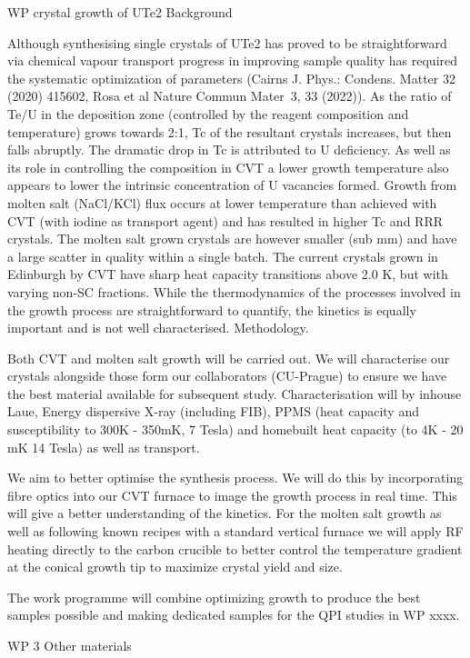 WP crystal growth of UTe2
Background

Although synthesising single crystals of UTe2 has proved to be straightforward via chemical vapour transport progress in improving sample quality has required the systematic optimization of parameters (Cairns J. Phys.: Condens. Matter 32 (2020) 415602, Rosa et al Nature Commun Mater 3, 33 (2022)). As the ratio of Te/U in the deposition zone (controlled by the reagent composition and temperature) grows towards 2:1, Tc of the resultant crystals increases, but then falls abruptly. The dramatic drop in Tc is attributed to U deficiency. As well as its role in controlling the composition in CVT a lower growth temperature also appears to lower the intrinsic concentration of U vacancies formed. Growth from molten salt (NaCl/KCl) flux occurs at lower temperature than achieved with CVT (with iodine as transport agent) and has resulted in higher Tc and RRR crystals. The molten salt grown crystals are however smaller (sub mm) and have a large scatter in quality within a single batch. The current crystals grown in Edinburgh by CVT have sharp heat capacity transitions above 2.0 K, but with varying non-SC fractions. While the thermodynamics of the processes involved in the growth process are straightforward to quantify, the kinetics is equally important and is not well characterised.
Methodology.

Both CVT and molten salt growth will be carried out. We will characterise our crystals alongside those form our collaborators (CU-Prague) to ensure we have the best material available for subsequent study. Characterisation will  by inhouse Laue, Energy dispersive X-ray (including FIB), PPMS (heat capacity and susceptibility to 300K - 350mK, 7 Tesla) and homebuilt heat capacity (to 4K - 20 mK 14 Tesla) as well as transport.

We aim to better optimise the synthesis process. We will do this by incorporating fibre optics into our CVT furnace to image the growth process in real time. This will give a better understanding of the kinetics. For the molten salt growth as well as following known recipes with a standard vertical furnace we will apply RF heating directly to the carbon crucible to better control the temperature gradient at the conical growth tip to maximize crystal yield and size.

The work programme will combine optimizing growth to produce the best samples possible and making dedicated samples for the QPI studies in WP xxxx.

WP 3 Other materials

